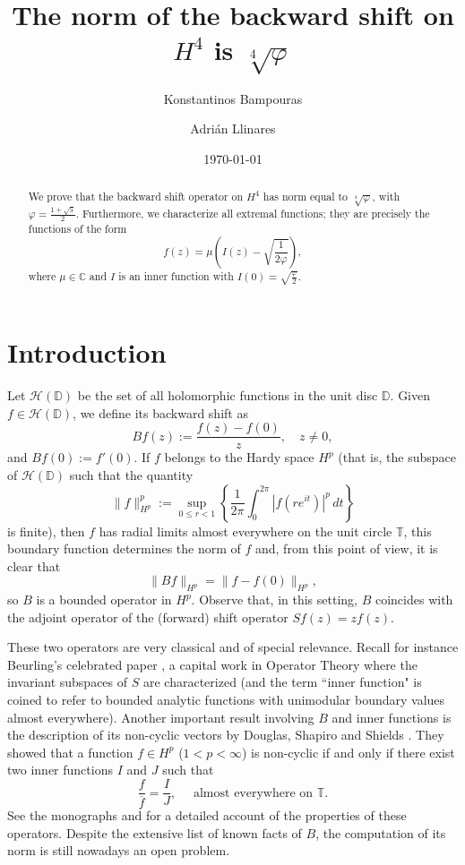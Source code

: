 \documentclass{amsart}
\title[Norm of $B$ on $H^4$]{The norm of the backward shift on $H^4$ is $\sqrt[4]{\varphi}$}
\author[K. Bampouras]{Konstantinos Bampouras}
\author[A. Llinares]{Adri\'an Llinares}
\date{\today}
\theoremstyle{plain}
\theoremstyle{definition}
\newcommand{\C}{\mathbb{C}}
\newcommand{\D}{\mathbb{D}}
\newcommand{\T}{\mathbb{T}}
\newcommand{\Hol}{\mathcal{H}(\D)}
\begin{document}
	
	\begin{abstract}
		We prove that the backward shift operator on $H^4$ has norm equal to $\sqrt[4]{\varphi}$, with $\varphi = \frac{1 + \sqrt{5}}{2}$. Furthermore, we characterize all extremal functions; they are precisely the functions of the form
		\[
		f(z) = \mu \left( I(z) - \sqrt{\frac{1}{2\varphi}}\right),
		\]
		where $\mu \in \C$ and $I$ is an inner function with $I(0) = \sqrt{\frac{\varphi}{2}}$.
	\end{abstract}
	
	\maketitle
	
	\section{Introduction}
	
    	Let $\Hol$ be the set of all holomorphic functions in the unit disc $\D$. Given $f \in \Hol$, we define its backward shift as
    	\[
    	Bf(z) := \dfrac{f(z) - f(0)}{z}, \quad z \neq 0,
    	\]
    	and $Bf(0) := f'(0)$. If $f$ belongs to the Hardy space $H^p$ (that is, the subspace of $\Hol$ such that the quantity
    	\[
    	\| f \|_{H^p}^p := \sup_{0 \leq r < 1} \left \{ \dfrac{1}{2\pi} \int_0^{2\pi} |f(re^{it})|^p \, dt \right\}
    	\]
    	is finite), then $f$ has radial limits almost everywhere on the unit circle $\T$, this boundary function determines the norm of $f$ and, from this point of view, it is clear that
    	\[
    	\| Bf \|_{H^p} = \| f - f(0) \|_{H^p},
    	\]
    	so $B$ is a bounded operator in $H^p$. Observe that, in this setting, $B$ coincides with the adjoint operator of the (forward) shift operator $Sf (z) = zf(z)$.
    	
    	These two operators are very classical and of special relevance. Recall for instance Beurling's celebrated paper \cite{MR27954}, a capital work in Operator Theory where the invariant subspaces of $S$ are characterized (and the term ``inner function" is coined to refer to bounded analytic functions with unimodular boundary values almost everywhere). Another important result involving $B$ and inner functions is the description of its non-cyclic vectors by Douglas, Shapiro and Shields \cite{MR270196}. They showed that a function $f \in H^p$ ($1 < p <\infty$) is non-cyclic if and only if there exist two inner functions $I$ and $J$ such that
    	\[
    	\frac{f}{\overline{f}} = \frac{I}{J}, \quad \mbox{ almost everywhere on } \T.
    	\]
    	See the monographs \cite{MR1761913} and \cite{MR827223} for a detailed account of the properties of these operators. Despite the extensive list of known facts of $B$, the computation of its norm is still nowadays an open problem.
    	
\end{document}
